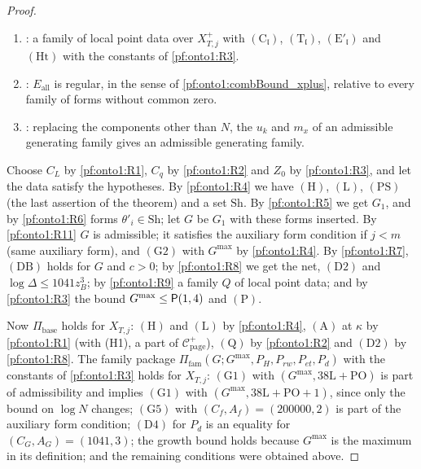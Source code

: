 \begin{proof}
\begin{enumerate}[label=(R\arabic*)]
$P_d=\ontoonePP(1041,3)(1+\log\ontoonesize\kappa)$, $(\mathrm D2)$, and $\log\Delta\le1041z_B^3$ under $(\mathrm L)$ and $(\mathrm{Sh}_\Delta)$.
\item\label{pf:onto1:R9} : a family of local point data over $X^+_{T,j}$ with $(\mathrm C_{\mathfrak l})$,
$(\mathrm T_{\mathfrak l})$, $(\mathrm E'_{\mathfrak l})$ and $(\mathrm{Ht})$ with the constants of \ref{pf:onto1:R3}.
\item\label{pf:onto1:R10} : $E_{\mathrm{all}}$ is regular, in the
sense of \cref{pf:onto1:combBound_xplus}, relative to every family of forms without common zero.
\item\label{pf:onto1:R11} : replacing the components other than $N$, the
$u_k$ and $m_x$ of an admissible generating family gives an admissible generating family.
\end{enumerate}
Choose $C_L$ by \ref{pf:onto1:R1}, $C_q$ by \ref{pf:onto1:R2} and $Z_0$ by \ref{pf:onto1:R3}, and let the data satisfy the
hypotheses. By \ref{pf:onto1:R4} we have $(\mathrm H)$, $(\mathrm L)$, $(\mathrm{PS})$ (the last assertion of the theorem)
and a set $\mathrm{Sh}$. By \ref{pf:onto1:R5} we get $G_1$, and by \ref{pf:onto1:R6} forms $\theta'_i\in\mathrm{Sh}$; let $G$ be
$G_1$ with these forms inserted. By \ref{pf:onto1:R11} $G$ is admissible; it satisfies the auxiliary form condition if
$j<m$ (same auxiliary form), and $(\mathrm G2)$ with $G^{\max}$ by \ref{pf:onto1:R4}. By \ref{pf:onto1:R7}, $(\mathrm{DB})$ holds
for $G$ and $c>0$; by \ref{pf:onto1:R8} we get the net, $(\mathrm D2)$ and $\log\Delta\le1041z_B^3$; by \ref{pf:onto1:R9} a
family $Q$ of local point data; and by \ref{pf:onto1:R3} the bound $G^{\max}\le\mathsf{P}(1,4)$ and $(\mathrm P)$.

Now $\Pi_{\mathrm{base}}$ holds for $X_{T,j}$: $(\mathrm H)$ and $(\mathrm L)$ by \ref{pf:onto1:R4}, $(\mathrm A)$ at $\kappa$ by
\ref{pf:onto1:R1} (with (H1), a part of $\mathcal C^+_{\mathrm{page}}$), $(\mathrm Q)$ by \ref{pf:onto1:R2} and $(\mathrm D2)$
by \ref{pf:onto1:R8}. The family package $\Pi_{\mathrm{fam}}(G;G^{\max},P_H,P_{rw},P_{et},P_d)$ with the constants of
\ref{pf:onto1:R3} holds for $X_{T,j}$: $(\mathrm G1)$ with $(G^{\max},38\mathrm L+\mathrm{PO})$ is part of admissibility and
implies $(\mathrm G1)$ with $(G^{\max},38\mathrm L+\mathrm{PO}+1)$, since only the bound on $\log N$ changes; $(\mathrm G5)$ with
$(C_f,A_f)=(200000,2)$ is part of the auxiliary form condition; $(\mathrm D4)$ for $P_d$ is an equality for
$(C_G,A_G)=(1041,3)$; the growth bound holds because $G^{\max}$ is the maximum in its definition; and the remaining
conditions were obtained above.


\end{proof}
